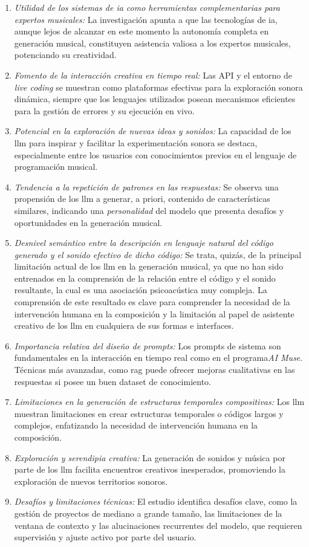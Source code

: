 \begin{enumerate}
    \item \textit{Utilidad de los sistemas de \gls{ia} como herramientas complementarias para expertos musicales:} La investigación apunta a que las tecnologías de \gls{ia}, aunque lejos de alcanzar en este momento la autonomía completa en generación musical, constituyen asistencia valiosa a los expertos musicales, potenciando su creatividad.
    \item \textit{Fomento de la interacción creativa en tiempo real:} Las API y el entorno de \emph{live coding} se muestran como plataformas efectivas para la exploración sonora dinámica, siempre que los lenguajes utilizados posean mecanismos eficientes para la gestión de errores y su ejecución en vivo.
    \item \textit{Potencial en la exploración de nuevas ideas y sonidos:} La capacidad de los \gls{llm} para inspirar y facilitar la experimentación sonora se destaca, especialmente entre los usuarios con conocimientos previos en el lenguaje de programación musical.
    \item \textit{Tendencia a la repetición de patrones en las respuestas:} Se observa una propensión de los \gls{llm} a generar, a priori, contenido de características similares, indicando una \emph{personalidad} del modelo que presenta desafíos y oportunidades en la generación musical.
    \item \textit{Desnivel semántico entre la descripción en lenguaje natural del código generado y el sonido efectivo de dicho código:} Se trata, quizás, de la principal limitación actual de los \gls{llm} en la generación musical, ya que no han sido entrenados en la comprensión de la relación entre el código y el sonido resultante, la cual es una asociación psicoacústica muy compleja. La comprensión de este resultado es clave para comprender la necesidad de la intervención humana en la composición y la limitación al papel de asistente creativo de los \gls{llm} en cualquiera de sus formas e interfaces.
    \item \textit{Importancia relativa del diseño de prompts:} Los prompts de sistema son fundamentales en la interacción en tiempo real como en el programa\emph{AI Muse}. Técnicas más avanzadas, como \gls{rag} puede ofrecer mejoras cualitativas en las respuestas si posee un buen dataset de conocimiento. 
    \item \textit{Limitaciones en la generación de estructuras temporales compositivas:} Los \gls{llm} muestran limitaciones en crear estructuras temporales o códigos largos y complejos, enfatizando la necesidad de intervención humana en la composición.
    \item \textit{Exploración y serendipia creativa:} La generación de sonidos y música por parte de los \gls{llm} facilita encuentros creativos inesperados, promoviendo la exploración de nuevos territorios sonoros.
    \item \textit{Desafíos y limitaciones técnicas:} El estudio identifica desafíos clave, como la gestión de proyectos de mediano a grande tamaño, las limitaciones de la ventana de contexto y las alucinaciones recurrentes del modelo, que requieren supervisión y ajuste activo por parte del usuario.


\end{enumerate}
